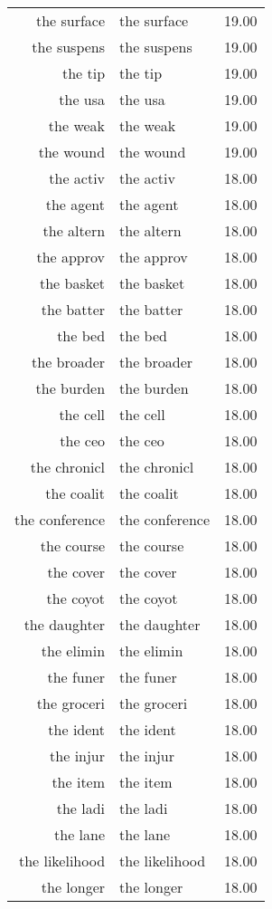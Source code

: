 \begin{table}[ht]
\begin{tabular}{rlr}
  the surface & the surface & 19.00 \\ 
  the suspens & the suspens & 19.00 \\ 
  the tip & the tip & 19.00 \\ 
  the usa & the usa & 19.00 \\ 
  the weak & the weak & 19.00 \\ 
  the wound & the wound & 19.00 \\ 
  the activ & the activ & 18.00 \\ 
  the agent & the agent & 18.00 \\ 
  the altern & the altern & 18.00 \\ 
  the approv & the approv & 18.00 \\ 
  the basket & the basket & 18.00 \\ 
  the batter & the batter & 18.00 \\ 
  the bed & the bed & 18.00 \\ 
  the broader & the broader & 18.00 \\ 
  the burden & the burden & 18.00 \\ 
  the cell & the cell & 18.00 \\ 
  the ceo & the ceo & 18.00 \\ 
  the chronicl & the chronicl & 18.00 \\ 
  the coalit & the coalit & 18.00 \\ 
  the conference & the conference & 18.00 \\ 
  the course & the course & 18.00 \\ 
  the cover & the cover & 18.00 \\ 
  the coyot & the coyot & 18.00 \\ 
  the daughter & the daughter & 18.00 \\ 
  the elimin & the elimin & 18.00 \\ 
  the funer & the funer & 18.00 \\ 
  the groceri & the groceri & 18.00 \\ 
  the ident & the ident & 18.00 \\ 
  the injur & the injur & 18.00 \\ 
  the item & the item & 18.00 \\ 
  the ladi & the ladi & 18.00 \\ 
  the lane & the lane & 18.00 \\ 
  the likelihood & the likelihood & 18.00 \\ 
  the longer & the longer & 18.00 \\ 

\end{tabular}
\end{table}
